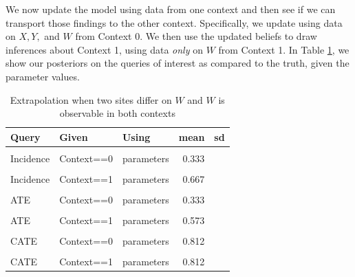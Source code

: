 \documentclass[
  12pt,
]{book}
\begin{document}
We now update the model using data from one context and then see if we can transport those findings to the other context. Specifically, we update using data on \(X, Y,\) and \(W\) from Context 0. We then use the updated beliefs to draw inferences about Context 1, using data \emph{only} on \(W\) from Context 1. In Table \ref{tab:appev3}, we show our posteriors on the queries of interest as compared to the truth, given the parameter values.

\begin{table}

\caption{\label{tab:appev3}Extrapolation when two sites differ on $W$ and $W$ is observable in both contexts}
\centering
\begin{tabular}[t]{lllrr}
\toprule
Query & Given & Using & mean & sd\\
\midrule
\cellcolor{gray!6}{Incidence} & \cellcolor{gray!6}{Context==0} & \cellcolor{gray!6}{posteriors} & \cellcolor{gray!6}{0.324} & \cellcolor{gray!6}{0.007}\\
Incidence & Context==0 & parameters & 0.333 & \\
\cellcolor{gray!6}{Incidence} & \cellcolor{gray!6}{Context==1} & \cellcolor{gray!6}{posteriors} & \cellcolor{gray!6}{0.676} & \cellcolor{gray!6}{0.007}\\
Incidence & Context==1 & parameters & 0.667 & \\
\cellcolor{gray!6}{ATE} & \cellcolor{gray!6}{Context==0} & \cellcolor{gray!6}{posteriors} & \cellcolor{gray!6}{0.330} & \cellcolor{gray!6}{0.011}\\
\addlinespace
ATE & Context==0 & parameters & 0.333 & \\
\cellcolor{gray!6}{ATE} & \cellcolor{gray!6}{Context==1} & \cellcolor{gray!6}{posteriors} & \cellcolor{gray!6}{0.578} & \cellcolor{gray!6}{0.009}\\
ATE & Context==1 & parameters & 0.573 & \\
\cellcolor{gray!6}{CATE} & \cellcolor{gray!6}{Context==0} & \cellcolor{gray!6}{posteriors} & \cellcolor{gray!6}{0.807} & \cellcolor{gray!6}{0.009}\\
CATE & Context==0 & parameters & 0.812 & \\
\addlinespace
\cellcolor{gray!6}{CATE} & \cellcolor{gray!6}{Context==1} & \cellcolor{gray!6}{posteriors} & \cellcolor{gray!6}{0.807} & \cellcolor{gray!6}{0.009}\\
CATE & Context==1 & parameters & 0.812 & \\
\bottomrule
\end{tabular}
\end{table}
\end{document}
